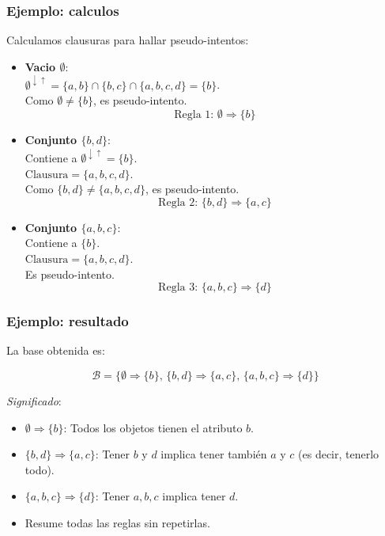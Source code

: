 \documentclass{beamer}
\begin{document}
  \begin{frame}
    \frametitle{Ejemplo: calculos}
    Calculamos clausuras para hallar pseudo-intentos:

    \bigskip
    \pause

    \begin{itemize}[<+->]
      \item \textbf{Vacio $\emptyset$}: \\
        $\emptyset^{\downarrow\uparrow} = \{a,b\} \cap \{b,c\}
        \cap \{a,b,c,d\} = \{b\}$. \\
        Como $\emptyset \neq \{b\}$, es pseudo-intento. \\
        $$\text{Regla 1: } \emptyset \Rightarrow \{b\}$$

      \item \textbf{Conjunto $\{b, d\}$}: \\
        Contiene a $\emptyset^{\downarrow\uparrow} = \{b\}$. \\
        $\text{Clausura} = \{a, b, c, d\}$. \\
        Como $\{b,d\} \neq \{a,b,c,d\}$, es pseudo-intento. \\
        $$\text{Regla 2: } \{b, d\} \Rightarrow \{a, c\}$$

      \item \textbf{Conjunto $\{a, b, c\}$}: \\
        Contiene a $\{b\}$. \\
        $\text{Clausura} = \{a, b, c, d\}$. \\
        Es pseudo-intento. \\
        $$\text{Regla 3: } \{a, b, c\} \Rightarrow \{d\}$$
    \end{itemize}
  \end{frame}

  \begin{frame}
    \frametitle{Ejemplo: resultado}
    La base obtenida es:

    \[
      \mathcal{B} = \{
        \emptyset \Rightarrow \{b\}, \,
        \{b, d\} \Rightarrow \{a, c\}, \,
        \{a, b, c\} \Rightarrow \{d\}
      \}
    \]

    \bigskip
    \pause

    \textit{Significado}:

    \pause
    \begin{itemize}[<+->]
      \item $\emptyset \Rightarrow \{b\}$: Todos los objetos
        tienen el atributo $b$.
      \item $\{b, d\} \Rightarrow \{a, c\}$: Tener $b$ y $d$
        implica tener también $a$ y $c$ (es decir, tenerlo todo).
      \item $\{a, b, c\} \Rightarrow \{d\}$: Tener $a,b,c$
        implica tener $d$.
      \item Resume todas las reglas sin repetirlas.
    \end{itemize}
  \end{frame}
\end{document}
